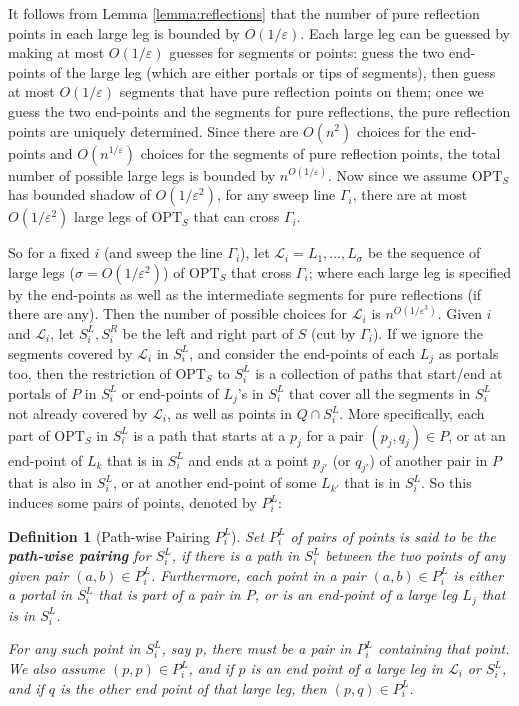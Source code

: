 \documentclass[10pt,a4paper]{amsart}
\theoremstyle{thmstyleone}
\newtheorem{definition}{Definition} %
\newcommand{\eps}{\varepsilon}
\newcommand{\OPT}{{\text{OPT}}}
\begin{document}
It follows from Lemma \ref{lemma:reflections} that the number of pure reflection points in each large leg is bounded by $O(1/\eps)$. Each large leg can be guessed by making at most $O(1/\eps)$ guesses for segments or points: guess the two end-points of the large leg (which are either portals or tips of segments), then guess at most $O(1/\eps)$ segments that have pure reflection points on them; once we guess the two end-points and the segments for pure reflections, the pure reflection points are uniquely determined. Since there are $O(n^2)$ choices for the end-points and $O(n^{1/\eps})$ choices for the segments of pure reflection points, the total number of possible large legs is bounded by $n^{O(1/\eps)}$. 
Now since we assume $\OPT_S$ has bounded shadow of $O(1/\eps^2)$, for any sweep line $\Gamma_i$, there are at most $O(1/\eps^2)$ large legs of $\OPT_S$ that can cross $\Gamma_i$. 

So for a fixed $i$ (and sweep the line $\Gamma_i$), let
$\mathcal L_i= L_1,\ldots,L_\sigma$ be the sequence of large legs ($\sigma=O(1/{\eps^2})$) of $\OPT_S$
that cross $\Gamma_i$; where each large leg is specified by the end-points as well as the intermediate segments for pure reflections (if there are any). Then the number of possible choices for $\mathcal L_i$ is $n^{O(1/\eps^3)}$. 
Given $i$ and $\mathcal L_i$, let $S^L_{i},S^R_i$ be the left and right part of $S$ (cut by $\Gamma_i$).
If we ignore the segments covered by $\mathcal L_i$ in $S^L_i$, and consider
the end-points of each $L_j$ as portals too, then the restriction of $\OPT_S$ to $S^L_i$ is a collection of paths that start/end at portals of $P$ in $S^L_i$ or end-points of $L_j$'s in $S^L_i$
that cover all the segments in $S^L_i$ not already covered by $\mathcal L_i$, as well as points in $Q\cap S^L_i$.
More specifically, each part of $\OPT_S$ in $S^L_i$ is a path that starts at a $p_j$ for a pair $(p_j,q_j)\in P$, or  at an end-point of $L_k$ that is in $S^L_i$ and ends at a point $p_{j'}$ (or $q_{j'}$) of another pair
in $P$ that is also in $S^L_i$, or at another end-point of some $L_{k'}$ that is in $S^L_i$. So this induces
some pairs of points, denoted by $P^L_i$:
\begin{definition}[Path-wise Pairing $ P^L_i $]
	Set $ P^L_i $ of pairs of points is said to be the \textbf{path-wise pairing} for $ S^L_i $, if there is a path in $ S^L_i $ between the two points of any given pair $ (a, b)\in P^L_i $. 
	Furthermore, each point in a pair $(a,b)\in P^L_i$ is either a portal in $S^L_i$ that is part of a pair in $P$,
	or is an end-point of a large leg $L_j$ that is in $S^L_i$. 
	
	For any such point in $ S^L_i $, say $ p $, there must be a pair in $ P^L_i $ containing that point. We also assume $ (p, p)\in P^L_i $, and if $ p $ is an end point of a large leg in $ \mathcal L_i $ or $ S_i^L $, and if $ q $ is the other end point of that large leg, then $ (p, q)\in P^L_i $.
\end{definition}
\end{document}
